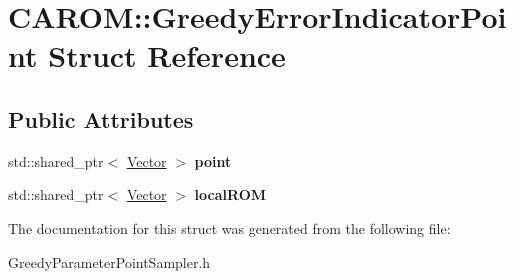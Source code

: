 \hypertarget{struct_c_a_r_o_m_1_1_greedy_error_indicator_point}{\section{C\-A\-R\-O\-M\-:\-:Greedy\-Error\-Indicator\-Point Struct Reference}
\label{struct_c_a_r_o_m_1_1_greedy_error_indicator_point}
}
\subsection*{Public Attributes}
\begin{DoxyCompactItemize}
\item 
\hypertarget{struct_c_a_r_o_m_1_1_greedy_error_indicator_point_abb75eb5bc4734dde207569af3644c928}{std\-::shared\-\_\-ptr$<$ \hyperlink{class_c_a_r_o_m_1_1_vector}{Vector} $>$ {\bfseries point}}\label{struct_c_a_r_o_m_1_1_greedy_error_indicator_point_abb75eb5bc4734dde207569af3644c928}

\item 
\hypertarget{struct_c_a_r_o_m_1_1_greedy_error_indicator_point_a74d08dc92e59858e79034ef55cd79ea1}{std\-::shared\-\_\-ptr$<$ \hyperlink{class_c_a_r_o_m_1_1_vector}{Vector} $>$ {\bfseries local\-R\-O\-M}}\label{struct_c_a_r_o_m_1_1_greedy_error_indicator_point_a74d08dc92e59858e79034ef55cd79ea1}

\end{DoxyCompactItemize}


The documentation for this struct was generated from the following file\-:\begin{DoxyCompactItemize}
\item 
Greedy\-Parameter\-Point\-Sampler.\-h\end{DoxyCompactItemize}
